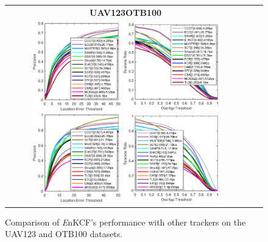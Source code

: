 \documentclass[10pt,twocolumn,letterpaper]{article}
\begin{document}
\begin{figure}[h]
\centering
\begin{tabular}{ccc}
\tiny\textbf{UAV123}\hspace{.43\linewidth}\textbf{OTB100}\\
\includegraphics[width=3.80cm]{./figures/pr_uav123.eps}
\includegraphics[width=4.10cm]{./figures/sr_uav123.eps}
\includegraphics[width=3.80cm]{./figures/pr_otb100.eps}
\includegraphics[width=4.10cm]{./figures/sr_otb100.eps}\\
\end{tabular}
\caption{Comparison of {\it E}nKCF's performance with other trackers on the UAV123 and OTB100 datasets.}
\label{fig:UAV123_DATASET}
\end{figure}
\end{document}
